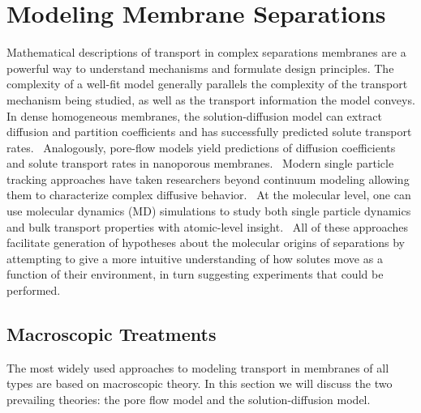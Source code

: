   \section{Modeling Membrane Separations}
  
  Mathematical descriptions of transport in complex separations membranes are a
  powerful way to understand mechanisms and formulate design principles.
  \cite{vinh-thang_predictive_2013,geens_transport_2006,darvishmanesh_mass_2016}
  The complexity of a well-fit model generally parallels the complexity of the
  transport mechanism being studied, as well as the transport information the
  model conveys. In dense homogeneous membranes, the solution-diffusion model
  can extract diffusion and partition coefficients and has successfully
  predicted solute transport rates.~\cite{wijmans_solution-diffusion_1995}
  Analogously, pore-flow models yield predictions of diffusion coefficients and
  solute transport rates in nanoporous membranes.~\cite{paul_diffusive_1974}
  Modern single particle tracking approaches have taken researchers beyond
  continuum modeling allowing them to characterize complex diffusive
  behavior.~\cite{manzo_review_2015} At the molecular level, one can use
  molecular dynamics (MD) simulations to study both single particle dynamics
  and bulk transport properties with atomic-level
  insight.~\cite{coscia_chemically_2019,maginn_best_2018} All of these
  approaches facilitate generation of hypotheses about the molecular origins of
  separations by attempting to give a more intuitive understanding of how
  solutes move as a function of their environment, in turn suggesting
  experiments that could be performed.

  \subsection{Macroscopic Treatments}
  
  The most widely used approaches to modeling transport in membranes of all types
  are based on macroscopic theory. In this section we will discuss the two prevailing
  theories: the pore flow model and the solution-diffusion model.
  
